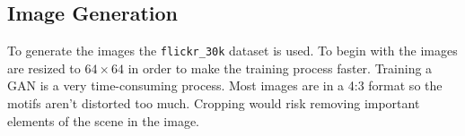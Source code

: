 \documentclass[../main.tex]{subfiles}
\begin{document}
\subsection{Image Generation}
To generate the images the \texttt{flickr\_30k} dataset is used. To begin with the images are resized to $64 \times 64$ in order to make the training process faster. Training a GAN is a very time-consuming process. Most images are in a 4:3 format so the motifs aren't distorted too much. Cropping would risk removing important elements of the scene in the image. 
\end{document}
